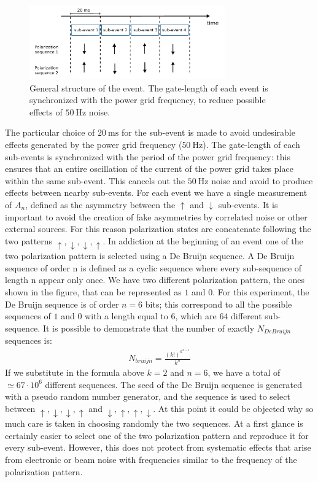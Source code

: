 \begin{figure}[hbtp] 
\centering
\includegraphics[width = 0.75\textwidth]{ExperimentalSetup/EventStructure.pdf}
\caption{General structure of the event. The gate-length of each event is synchronized with the power grid frequency, to reduce possible effects of $\SI{50}{\hertz}$ noise.}
\label{fig:EventStructure}
\end{figure}

The particular choice of $\SI{20}{\milli \second}$ for the sub-event is made to avoid undesirable effects generated by the power grid frequency ($\SI{50}{\hertz}$). The gate-length of each sub-events is synchronized with the period of the power grid frequency: this ensures that an entire oscillation of the current of the power grid takes place within the same sub-event. This cancels out the $\SI{50}{\hertz}$ noise and avoid to produce effects between nearby sub-events.
For each event we have a single measurement of $A_{n}$, defined as the asymmetry between the $\uparrow$ and $\downarrow$ sub-events. It is important to avoid the creation of fake asymmetries by correlated noise or other external sources. For this reason polarization states are concatenate following the two patterns $\uparrow, \downarrow, \downarrow, \uparrow$. In addiction at the beginning of an event one of the two polarization pattern is selected using a De Bruijn sequence. A De Bruijn sequence of order n is defined as a cyclic sequence where every sub-sequence of length n appear only once. We have two different polarization pattern, the ones shown in the figure, that can be represented as $1$ and $0$. For this experiment, the De Bruijn sequence is of order $n = 6$ bits; this correspond to all the possible sequences of $1$ and $0$ with a length equal to $6$, which are $64$ different sub-sequence.
It is possible to demonstrate that the number of exactly $N_{De Bruijn}$ sequences is: 
\begin{align*}
N_{bruijn} = \frac{(k!)^{k^{n-1}}}{k^{n}}
\end{align*}
If we substitute in the formula above $k=2$ and $n = 6$, we have a total of $\simeq 67 \cdot 10^{6}$ different sequences. The seed of the De Bruijn sequence is generated with a pseudo random number generator, and the sequence is used to select between $\uparrow,\downarrow,\downarrow, \uparrow$  and $\downarrow,\uparrow,\uparrow,\downarrow$. At this point it could be objected why so much care is taken in choosing randomly the two sequences. At a first glance is certainly easier to select one of the two polarization pattern and reproduce it for every sub-event. However, this does not protect from systematic effects that arise from electronic or beam noise with frequencies similar to the frequency of the polarization pattern.  
